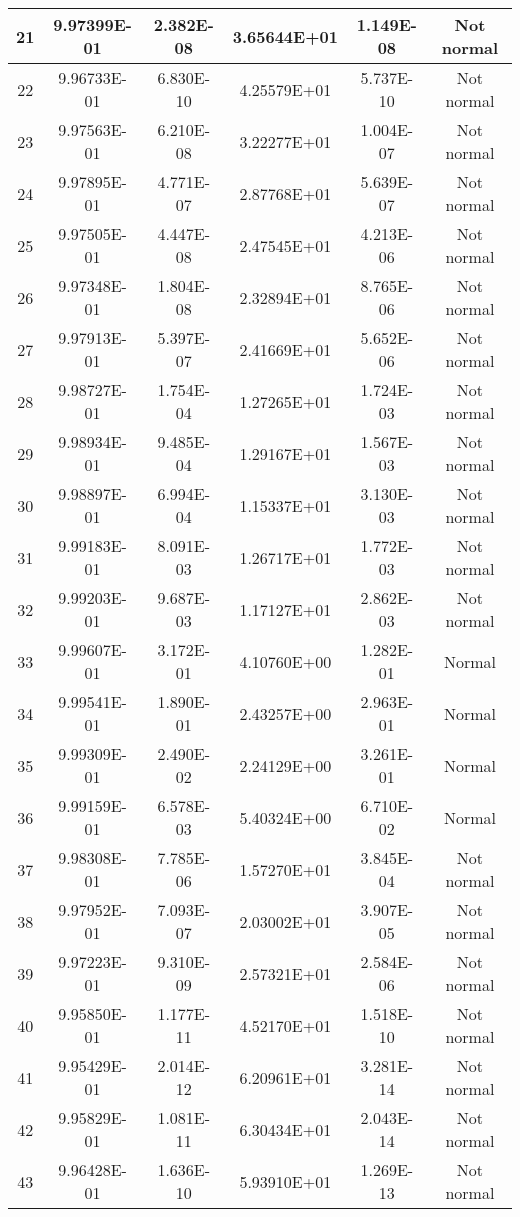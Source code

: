 \begin{table}[h]
\begin{tabular}{|c|c|c|c|c|c|}
		21 & 9.97399E-01 & 2.382E-08 & 3.65644E+01 & 1.149E-08 & Not normal\\\hline
		22 & 9.96733E-01 & 6.830E-10 & 4.25579E+01 & 5.737E-10 & Not normal\\\hline
		23 & 9.97563E-01 & 6.210E-08 & 3.22277E+01 & 1.004E-07 & Not normal\\\hline
		24 & 9.97895E-01 & 4.771E-07 & 2.87768E+01 & 5.639E-07 & Not normal\\\hline
		25 & 9.97505E-01 & 4.447E-08 & 2.47545E+01 & 4.213E-06 & Not normal\\\hline
		26 & 9.97348E-01 & 1.804E-08 & 2.32894E+01 & 8.765E-06 & Not normal\\\hline
		27 & 9.97913E-01 & 5.397E-07 & 2.41669E+01 & 5.652E-06 & Not normal\\\hline
		28 & 9.98727E-01 & 1.754E-04 & 1.27265E+01 & 1.724E-03 & Not normal\\\hline
		29 & 9.98934E-01 & 9.485E-04 & 1.29167E+01 & 1.567E-03 & Not normal\\\hline
		30 & 9.98897E-01 & 6.994E-04 & 1.15337E+01 & 3.130E-03 & Not normal\\\hline
		31 & 9.99183E-01 & 8.091E-03 & 1.26717E+01 & 1.772E-03 & Not normal\\\hline
		32 & 9.99203E-01 & 9.687E-03 & 1.17127E+01 & 2.862E-03 & Not normal\\\hline
		33 & 9.99607E-01 & 3.172E-01 & 4.10760E+00 & 1.282E-01 & Normal\\\hline
		34 & 9.99541E-01 & 1.890E-01 & 2.43257E+00 & 2.963E-01 & Normal\\\hline
		35 & 9.99309E-01 & 2.490E-02 & 2.24129E+00 & 3.261E-01 & Normal\\\hline
		36 & 9.99159E-01 & 6.578E-03 & 5.40324E+00 & 6.710E-02 & Normal\\\hline
		37 & 9.98308E-01 & 7.785E-06 & 1.57270E+01 & 3.845E-04 & Not normal\\\hline
		38 & 9.97952E-01 & 7.093E-07 & 2.03002E+01 & 3.907E-05 & Not normal\\\hline
		39 & 9.97223E-01 & 9.310E-09 & 2.57321E+01 & 2.584E-06 & Not normal\\\hline
		40 & 9.95850E-01 & 1.177E-11 & 4.52170E+01 & 1.518E-10 & Not normal\\\hline
		41 & 9.95429E-01 & 2.014E-12 & 6.20961E+01 & 3.281E-14 & Not normal\\\hline
		42 & 9.95829E-01 & 1.081E-11 & 6.30434E+01 & 2.043E-14 & Not normal\\\hline
		43 & 9.96428E-01 & 1.636E-10 & 5.93910E+01 & 1.269E-13 & Not normal\\\hline

\end{tabular}
\end{table}
